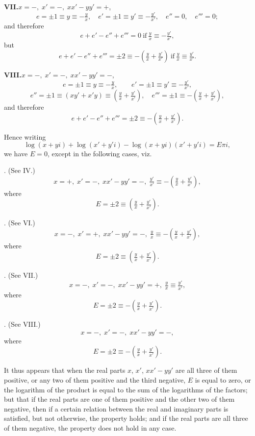 \documentclass[11pt]{article}
\begin{document}
\medskip
\noindent\textbf{VII.}\quad $x=-,\;x'=-,\;xx'-yy'=+$,
\[
e=\pm 1\equiv y\equiv-\tfrac{y}{x},\quad e'=\pm 1\equiv y'\equiv-\tfrac{y'}{x'},\quad e''=0,\quad e'''=0;
\]
and therefore
\[
e+e'-e''+e'''=0\ \text{if}\ \tfrac{y}{x}\equiv-\tfrac{y'}{x'},
\]
but
\[
e+e'-e''+e'''=\pm 2\equiv -\left(\tfrac{y}{x}+\tfrac{y'}{x'}\right)\ \text{if}\ \tfrac{y}{x}\equiv\tfrac{y'}{x'}.
\]

\clearpage

\noindent\textbf{VIII.}\quad $x=-,\;x'=-,\;xx'-yy'=-$,
\[
e=\pm 1\equiv y\equiv-\tfrac{y}{x},\qquad e'=\pm 1\equiv y'\equiv-\tfrac{y'}{x'},
\]
\[
e''=\pm 1\equiv(xy'+x'y)\equiv\left(\tfrac{y}{x}+\tfrac{y'}{x'}\right),\quad e'''=\pm 1\equiv-\left(\tfrac{y}{x}+\tfrac{y'}{x'}\right),
\]
and therefore
\[
e+e'-e''+e'''=\pm 2\equiv-\left(\tfrac{y}{x}+\tfrac{y'}{x'}\right).
\]

Hence writing
\[
\log(x+yi)+\log(x'+y'i)-\log(x+yi)(x'+y'i)=E\pi i,
\]
we have $E=0$, except in the following cases, viz.

\medskip
{}. (See IV.)
\[
x=+,\;x'=-,\;xx'-yy'=-,\;\tfrac{y'}{x'}\equiv-\left(\tfrac{y}{x}+\tfrac{y'}{x'}\right),
\]
where
\[
E=\pm 2\equiv\left(\tfrac{y}{x}+\tfrac{y'}{x'}\right).
\]

. (See VI.)
\[
x=-,\;x'=+,\;xx'-yy'=-,\;\tfrac{y}{x}\equiv-\left(\tfrac{y}{x}+\tfrac{y'}{x'}\right),
\]
where
\[
E=\pm 2\equiv\left(\tfrac{y}{x}+\tfrac{y'}{x'}\right).
\]

. (See VII.)
\[
x=-,\;x'=-,\;xx'-yy'=+,\;\tfrac{y}{x}\equiv\tfrac{y'}{x'},
\]
where
\[
E=\pm 2\equiv-\left(\tfrac{y}{x}+\tfrac{y'}{x'}\right).
\]

. (See VIII.)
\[
x=-,\;x'=-,\;xx'-yy'=-,
\]
where
\[
E=\pm 2\equiv-\left(\tfrac{y}{x}+\tfrac{y'}{x'}\right).
\]

\clearpage

It thus appears that when the real parts $x$, $x'$, $xx'-yy'$ are all three of them positive, or any two of them positive and the third negative, $E$ is equal to zero, or the logarithm of the product is equal to the sum of the logarithms of the factors; but that if the real parts are one of them positive and the other two of them negative, then if a certain relation between the real and imaginary parts is satisfied, but not otherwise, the property holds; and if the real parts are all three of them negative, the property does not hold in any case.
\end{document}
